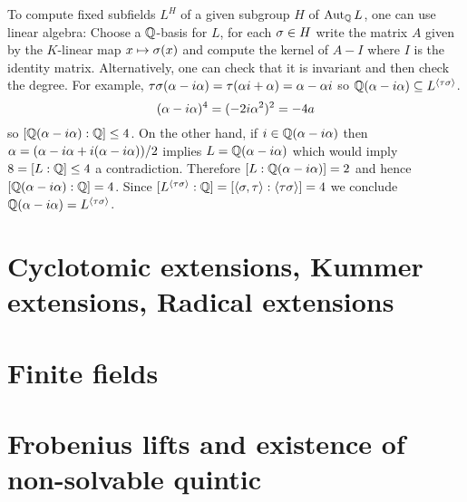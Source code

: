 \documentclass{article}
\begin{document}
\begin{eg}
\begin{cd}
    \arrow[from=2-3, to=1-3]
    \arrow[from=2-4, to=1-3]
    \arrow[from=2-5, to=1-3]
    \arrow[from=3-2, to=2-1]
    \arrow[from=3-2, to=2-2]
    \arrow[from=3-2, to=2-3]
    \arrow[from=3-3, to=2-3]
    \arrow[from=3-4, to=2-3]
    \arrow[from=3-4, to=2-4]
    \arrow[from=3-4, to=2-5]
    \arrow[from=4-3, to=3-2]
    \arrow[from=4-3, to=3-3]
    \arrow[from=4-3, to=3-4]
  \end{cd}
  To compute fixed subfields $L^H$ of a given subgroup $H$ of $\operatorname{Aut}_{\mathbb{Q}} L$,
  one can use linear algebra:
  Choose a $\mathbb{Q}$-basis for $L$,
  for each $\sigma \in H$
  write the matrix $A$ given by the $K$-linear map $x \mapsto \sigma(x)$
  and compute the kernel of $A - I$ where $I$ is the identity matrix.
  Alternatively, one can check that it is invariant and then check the degree.
  For example, $\tau\sigma(\alpha - i \alpha) = \tau(\alpha i + \alpha) = \alpha - \alpha i$
  so $\mathbb{Q}(\alpha - i \alpha) \subseteq L^{\langle \tau \sigma \rangle}$.
  \[
    (\alpha - i \alpha)^4 = (- 2 i \alpha^2)^2 = - 4 a
  \]
  so $[\mathbb{Q}(\alpha - i \alpha) : \mathbb{Q}] \leq 4$.
  On the other hand, if $i \in \mathbb{Q}(\alpha - i \alpha)$ then
  $\alpha = (\alpha - i \alpha + i (\alpha - i \alpha)) / 2$ implies
  $L = \mathbb{Q}(\alpha - i \alpha)$ which would imply $8 = [L : \mathbb{Q}] \leq 4$
  a contradiction.
  Therefore $[L : \mathbb{Q}(\alpha - i \alpha)] = 2$ and hence
  $[\mathbb{Q}(\alpha - i \alpha) : \mathbb{Q}] = 4$.
  Since $[L^{\langle \tau \sigma \rangle} : \mathbb{Q}] = [\langle \sigma , \tau \rangle : \langle \tau \sigma\rangle] = 4$
  we conclude $\mathbb{Q}(\alpha - i \alpha) = L^{\langle \tau \sigma \rangle}$.
\end{eg}

\section{Cyclotomic extensions, Kummer extensions, Radical extensions}

\section{Finite fields}

\section{Frobenius lifts and existence of non-solvable quintic}

\printbibliography
\end{document}
